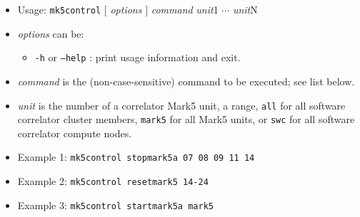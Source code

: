 \begin{itemize}
\item[] Usage: {\tt mk5control} $[$ {\em options} $]$ {\em command} {\em unit}1 $\cdots$ {\em unit}N
\item[] {\em options} can be:
\begin{itemize}
\item[] {\tt -h} or {\tt --help} : print usage information and exit.
\end{itemize}
\item[] {\em command} is the (non-case-sensitive) command to be executed; see list below.
\item[] {\em unit} is the number of a correlator Mark5 unit, a range, {\tt all} for all software correlator cluster members, {\tt mark5} for all Mark5 units, or {\tt swc} for all software correlator compute nodes.
\item[] Example 1: {\tt mk5control stopmark5a 07 08 09 11 14}
\item[] Example 2: {\tt mk5control resetmark5 14-24} 
\item[] Example 3: {\tt mk5control startmark5a mark5}
\end{itemize}

